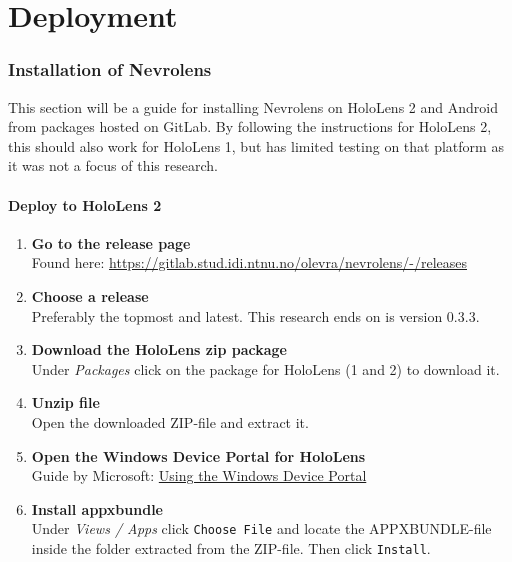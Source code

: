 \chapter{Deployment}


\subsection*{Installation of Nevrolens}

This section will be a guide for installing Nevrolens on HoloLens 2 and Android from packages hosted on GitLab.
By following the instructions for HoloLens 2, this should also work for HoloLens 1, but has limited testing on that platform as it was not a focus of this research.

\subsubsection*{Deploy to HoloLens 2}

\begin{enumerate}
    \item {
        \textbf{Go to the release page}\\
        Found here: \url{https://gitlab.stud.idi.ntnu.no/olevra/nevrolens/-/releases}
    }
    \item {
        \textbf{Choose a release}\\
        Preferably the topmost and latest. This research ends on is version 0.3.3. 
    }

    \item {
        \textbf{Download the HoloLens zip package}\\
        Under \textit{Packages} click on the package for HoloLens (1 and 2) to download it.
    }

    \item {
        \textbf{Unzip file}\\
        Open the downloaded ZIP-file and extract it.
    }

    \item {
        \textbf{Open the Windows Device Portal for HoloLens}\\
        Guide by Microsoft: \href{https://docs.microsoft.com/en-us/windows/mixed-reality/develop/platform-capabilities-and-apis/using-the-windows-device-portal}{Using the Windows Device Portal}
    }
    \item {
        \textbf{Install appxbundle}\\
        Under \textit{Views / Apps} click \texttt{Choose File} and locate the APPXBUNDLE-file inside the folder extracted from the ZIP-file. Then click \texttt{Install}.
    }

\end{enumerate}

